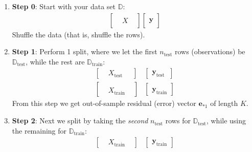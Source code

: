\documentclass[12pt, a4paper]{article}
\theoremstyle{definition}
\begin{document}
	\begin{enumerate}[label=(\alph*)]
		\item \textbf{Step 0}: Start with your data set $\mathbb{D}$:
		\begin{align*}
			\begin{bmatrix}
				{} & {} & {}\\
				{} & X & {}\\
				{} &   & {}
			\end{bmatrix}
			\begin{bmatrix}
				{}\\
				\mathbf{y}\\
				{}
			\end{bmatrix}
		\end{align*}
		Shuffle the data (that is, shuffle the rows).
		\item \textbf{Step 1}: Perform 1 split, where we let the first
		$n_{\text{test}}$ rows (observations) be $\mathbb{D}_{\text{test}}$, while the
		rest are $\mathbb{D}_{\text{train}}$:
		\begin{align*}
			\begin{bmatrix}
				{} & X_{\text{test\ \  }} & {}
			\end{bmatrix}
			&
			\begin{bmatrix}
				\mathbf{y}_{\text{test\ \ }}
			\end{bmatrix}\\
			\begin{bmatrix}
				{} & {} & {}\\
				{} & X_{\text{train}} & {}
			\end{bmatrix}
			&
			\begin{bmatrix}
				{}\\
				\mathbf{y}_{\text{train}}
			\end{bmatrix}
		\end{align*}
		From this step we get out-of-sample residual (error) vector $\mathbf{e}_{*1}$
		of length $K$.
		\item \textbf{Step 2}: Next we split by taking the \textit{second} $n_{\text{test}}$
		rows for $\mathbb{D}_{\text{test}}$, while using the remaining for $\mathbb{D}_{\text{train}}$:
		\begin{align*}
			\begin{bmatrix}
				{} & X_{\text{train}} & {}
			\end{bmatrix}
			&
			\begin{bmatrix}
				\mathbf{y}_{\text{train}}
			\end{bmatrix}\\

\end{align*}
\end{enumerate}
\end{document}
